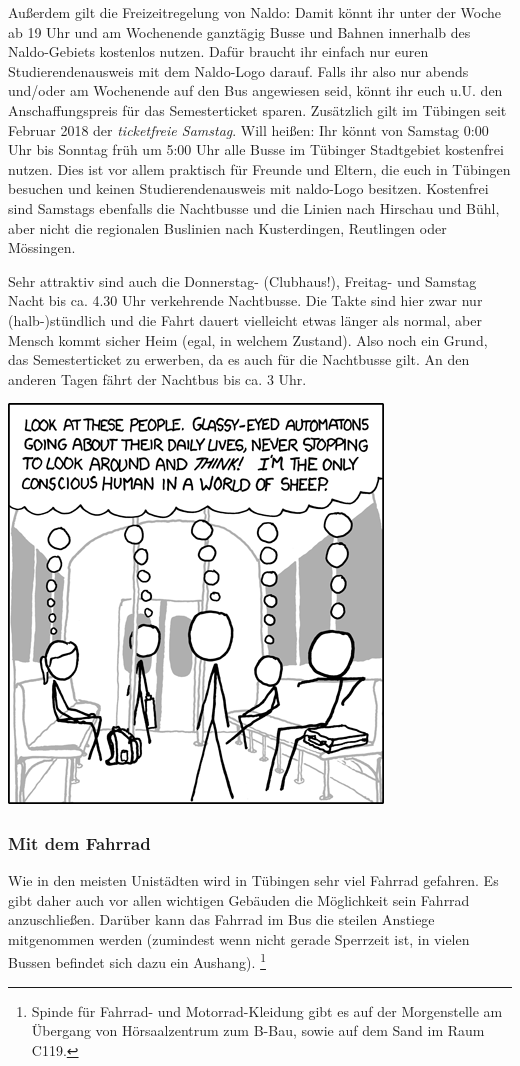 Außerdem gilt die Freizeitregelung von Naldo: Damit könnt ihr unter der Woche ab 19 Uhr und am Wochenende ganztägig
Busse und Bahnen innerhalb des Naldo-Gebiets kostenlos nutzen. Dafür braucht ihr einfach nur euren Studierendenausweis
mit dem Naldo-Logo darauf. Falls ihr also nur abends und/oder am Wochenende auf den Bus angewiesen seid, könnt ihr
euch u.U. den Anschaffungspreis für das Semesterticket sparen.
Zusätzlich gilt im Tübingen seit Februar 2018 der \emph{ticketfreie Samstag}. Will heißen: Ihr könnt von Samstag
0:00 Uhr bis Sonntag früh um 5:00 Uhr alle Busse im Tübinger Stadtgebiet kostenfrei nutzen. Dies ist vor allem praktisch
für Freunde und Eltern, die euch in Tübingen besuchen und keinen Studierendenausweis mit naldo-Logo besitzen.
Kostenfrei sind Samstags ebenfalls die Nachtbusse und die Linien nach Hirschau und Bühl, aber nicht die regionalen
Buslinien nach Kusterdingen, Reutlingen oder Mössingen.

Sehr attraktiv sind auch die Donnerstag- (Clubhaus!), Freitag- und Samstag Nacht bis ca. 4.30 Uhr verkehrende Nachtbusse.  Die Takte sind hier zwar nur (halb-)stündlich und die Fahrt dauert vielleicht etwas länger als normal, aber Mensch kommt sicher Heim (egal, in welchem Zustand).  Also noch ein Grund, das Semesterticket zu erwerben, da es auch für die Nachtbusse gilt. An den anderen Tagen fährt der Nachtbus bis ca. 3 Uhr.

\begin{center}
\includegraphics[width=0.5\hsize]{shared/xkcd/sheeple.png}
\end{center}

\subsubsection*{Mit dem Fahrrad}
Wie in den meisten Unistädten wird in Tübingen sehr viel Fahrrad gefahren. Es gibt daher auch vor allen wichtigen Gebäuden die Möglichkeit sein Fahrrad anzuschließen. Darüber kann das Fahrrad im Bus die steilen Anstiege mitgenommen werden (zumindest wenn nicht gerade Sperrzeit ist, in vielen Bussen befindet sich dazu ein Aushang).
\footnote{Spinde für Fahrrad- und Motorrad-Kleidung gibt es auf der Morgenstelle am Übergang von Hörsaalzentrum zum B-Bau, sowie auf dem Sand im Raum C119.}

